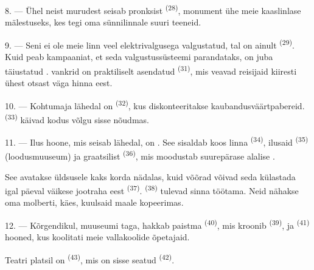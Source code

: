 8. --- Ühel neist murudest seisab pronksist  \textsuperscript{(28)},
monument ühe meie kaaslinlase mälestuseks, kes tegi oma sünnilinnale suuri teeneid.

\VUsaut{4.0mm}
\VUsaut{3.4mm}

9. --- Seni ei ole meie linn veel elektrivalgusega valgustatud, tal on ainult
 \textsuperscript{(29)}. Kuid  peab
kampaaniat, et seda valgustussüsteemi parandataks,  on juba
täiustatud .   
vankrid on praktiliselt asendatud  \textsuperscript{(31)}, mis
veavad reisijaid kiiresti  ühest otsast  väga 
hinna eest.

10. --- Kohtumaja lähedal on  \textsuperscript{(32)}, kus diskonteeritakse
kaubandusväärtpabereid.  \textsuperscript{(33)} käivad kodus
võlgu sisse nõudmas.

\VUsaut{4.0mm}
\VUsaut{3.4mm}

11. --- Ilus hoone, mis seisab lähedal, on . See sisaldab koos linna
 \textsuperscript{(34)}, ilusaid 
\textsuperscript{(35)} (loodusmuuseum) ja graatsilist 
\textsuperscript{(36)}, mis moodustab suurepärase alalise .

See avatakse üldsusele kaks korda nädalas, kuid võõrad võivad seda külastada igal
päeval väikese jootraha eest  \textsuperscript{(37)}.
 \textsuperscript{(38)} tulevad sinna töötama. Neid nähakse
 oma molberti,  käes, kuulsaid maale kopeerimas.

12. --- Kõrgendikul, muuseumi taga, hakkab paistma 
\textsuperscript{(40)}, mis kroonib  \textsuperscript{(39)}, ja
 \textsuperscript{(41)} hooned, kus koolitati meie vallakoolide
õpetajaid.

Teatri platsil on  \textsuperscript{(43)}, mis on sisse seatud
 \textsuperscript{(42)}.

\VUsaut{5.0mm}
\VUsaut{3.0mm}

